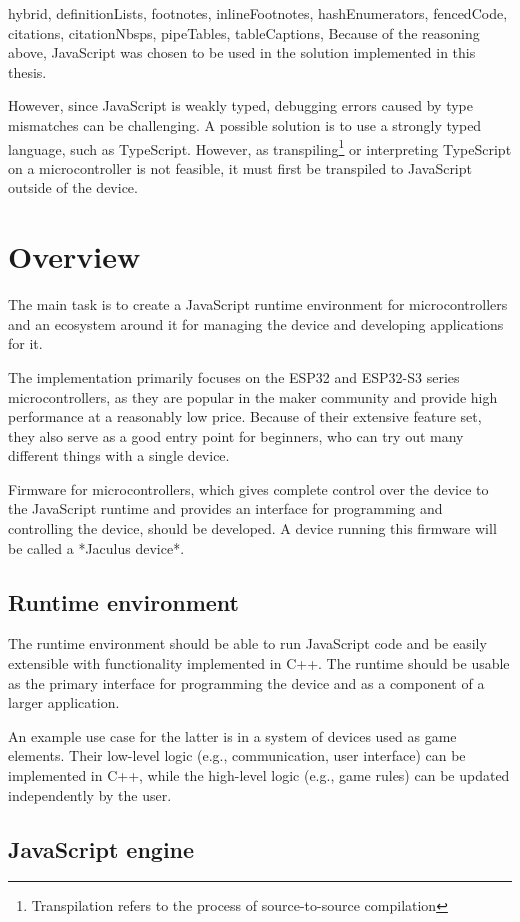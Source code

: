 \begin{markdown*}{%
  hybrid,
  definitionLists,
  footnotes,
  inlineFootnotes,
  hashEnumerators,
  fencedCode,
  citations,
  citationNbsps,
  pipeTables,
  tableCaptions,
}
Because of the reasoning above, JavaScript was chosen to be used in the solution implemented in this thesis.

However, since JavaScript is weakly typed, debugging errors caused by type mismatches can be challenging. A possible solution is to use a strongly typed language, such as TypeScript. However, as transpiling\footnote{Transpilation refers to the process of source-to-source compilation} or interpreting TypeScript on a microcontroller is not feasible, it must first be transpiled to JavaScript outside of the device.


\chapter{Overview}

The main task is to create a JavaScript runtime environment for microcontrollers and an ecosystem around it for managing the device and developing applications for it.

The implementation primarily focuses on the ESP32 and ESP32-S3 series microcontrollers, as they are popular in the maker community and provide high performance at a reasonably low price. Because of their extensive feature set, they also serve as a good entry point for beginners, who can try out many different things with a single device.

Firmware for microcontrollers, which gives complete control over the device to the JavaScript runtime and provides an interface for programming and controlling the device, should be developed. A device running this firmware will be called a *Jaculus device*.

\section{Runtime environment}

The runtime environment should be able to run JavaScript code and be easily extensible with functionality implemented in C++. The runtime should be usable as the primary interface for programming the device and as a component of a larger application.

An example use case for the latter is in a system of devices used as game elements. Their low-level logic (e.g., communication, user interface) can be implemented in C++, while the high-level logic (e.g., game rules) can be updated independently by the user.

\section{JavaScript engine}


\end{markdown*}
